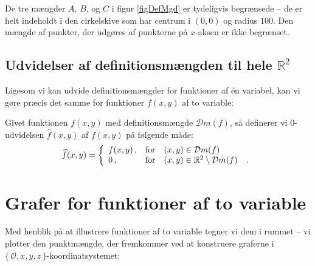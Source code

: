 \begin{example}
De tre mængder $A$, $B$, og $C$ i figur \ref{figDefMgd} er tydeligvis begrænsede -- de er helt indeholdt i den cirkelskive som har centrum i $(0,0)$ og radius $100$. Den mængde af punkter, der udgøres af punkterne på $x$-aksen er ikke begrænset.
\end{example}


\subsection[Udvidelser af definitionsmængden til hele planen]{Udvidelser af definitionsmængden til hele $\mathbb{R}^{2}$}
Ligesom vi kan udvide definitionsmængder for funktioner af \'{e}n variabel, kan vi gøre præcis det samme for funktioner $f(x,y)$ af to variable:

\begin{definition}
Givet funktionen $f(x,y)$ med definitionsmængde  $\mathcal{D}m(f)$, så definerer vi
$0$-udvidelsen $\widehat{f}(x,y)$ af  $f(x,y)$ på følgende måde:
\begin{equation}
\widehat{f}(x,y) = \left\{
                      \begin{array}{ll}
                        f(x,y)\, , & \hbox{for} \quad (x, y) \in \mathcal{D}m(f)\\
                        0 \, , & \hbox{for} \quad  (x,y) \in \mathbb{R}^{2} \setminus \mathcal{D}m(f) \quad .
                      \end{array}
                    \right.
\end{equation}
\end{definition}

\section{Grafer for funktioner af to variable}
Med henblik på at illustrere funktioner af to variable tegner vi dem  i rummet -- vi plotter den punktmængde, der fremkommer ved at konstruere graferne  i $\{\,\mathcal{O}, x, y, z\,\}$-koordinatsystemet:

